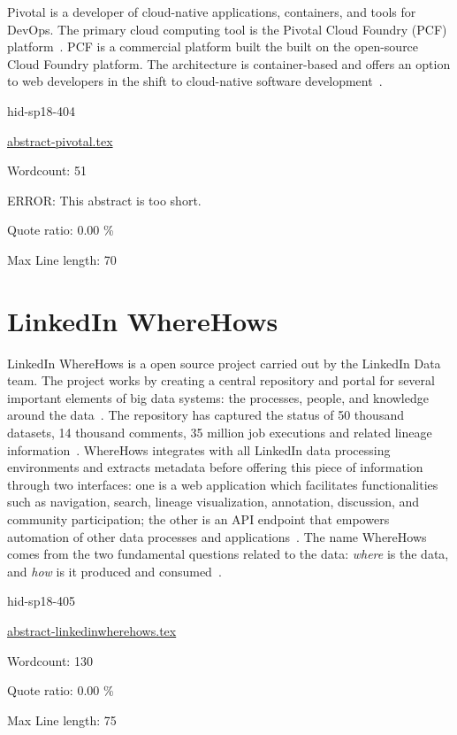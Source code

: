 Pivotal is a developer of cloud-native applications, containers, and
tools for DevOps. The primary cloud computing tool is the Pivotal
Cloud Foundry (PCF) platform~\cite{hid-sp18-404-Pivotal2017}. PCF is a
commercial platform built the built on the open-source Cloud Foundry
platform. The architecture is container-based and offers an option to
web developers in the shift to cloud-native software
development~\cite{hid-sp18-404-Darrow2016}.


\begin{IU}

hid-sp18-404

\href{https://github.com/cloudmesh-community/hid-sp18-404/blob/master//technology/abstract-pivotal.tex}{abstract-pivotal.tex}

 

Wordcount: 51

ERROR: This abstract is too short.


Quote ratio: 0.00 \%
 
Max Line length: 70
\end{IU}

\section{LinkedIn WhereHows}

LinkedIn WhereHows is a open source project carried out by the
LinkedIn Data team. The project works by creating a central repository
and portal for several important elements of big data systems: the
processes, people, and knowledge around the
data~\cite{hid-sp18-405-www-wherehows}. The repository has captured
the status of 50 thousand datasets, 14 thousand comments, 35 million
job executions and related lineage
information~\cite{hid-sp18-405-www-wherehows}. WhereHows integrates
with all LinkedIn data processing environments and extracts metadata
before offering this piece of information through two interfaces: one
is a web application which facilitates functionalities such as navigation, 
search, lineage visualization, annotation, discussion, and community 
participation; the other is an API endpoint that empowers automation of 
other data processes and applications~\cite{hid-sp18-405-www-wherehows}. 
The name WhereHows comes from the two fundamental questions related to 
the data: \textit{where} is the data, and \textit{how} is it produced and 
consumed~\cite{hid-sp18-405-githubwiki-wherehows}.


\begin{IU}

hid-sp18-405

\href{https://github.com/cloudmesh-community/hid-sp18-405/blob/master//technology/abstract-linkedinwherehows.tex}{abstract-linkedinwherehows.tex}

 

Wordcount: 130


Quote ratio: 0.00 \%
 
Max Line length: 75
\end{IU}

